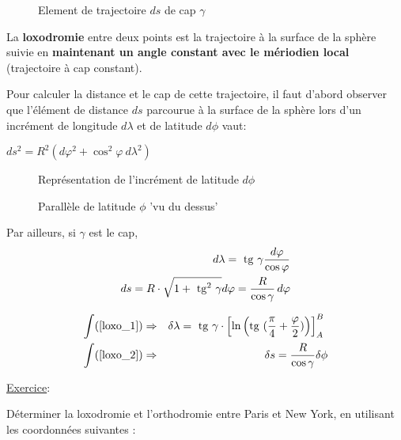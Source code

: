 \documentclass[12pt]{report}
\def\tan{\mathrm{tg}}
\begin{document}
\begin{figure}[ht]
\begin{center}
\end{center}
\caption{Element de trajectoire $ds$ de cap $\gamma$}
\label{fig:11}
\end{figure}


La \textbf{loxodromie} entre deux points est la trajectoire à la surface de la sphère suivie en \textbf{maintenant un angle constant avec le mériodien local} (trajectoire à cap constant). 

Pour calculer la distance et le cap de cette trajectoire, il faut d'abord observer que l'élément de distance $ds$ parcourue à la surface de la sphère lors d'un incrément de longitude $d\lambda$ et de latitude $d\phi$ vaut:

$ds^2=R^2(d\varphi^2+\cos^2\varphi \ d\lambda^2)$

\begin{figure}[ht]
\begin{center}
\end{center}
\caption{Représentation de l'incrément de latitude $d\phi$}
\label{fig:12}
\end{figure}

\begin{figure}[ht]
\begin{center}
\end{center}
\caption{Parallèle de latitude $\phi$ 'vu du dessus'}
\label{fig:13}
\end{figure}


Par ailleurs, si $\gamma$ est le cap,
\begin{eqnarray}
d\lambda = \ \tan \  \gamma {d\varphi\over \cos \varphi} \label{loxo_1} \\
ds = R \cdot \sqrt {1+\ \tan^2 \  \gamma} d\varphi  = \frac{R}{\cos\gamma}\,d\varphi \label{loxo_2}
\end{eqnarray}

\begin{eqnarray}
\int (\ref{loxo_1}) &\Rightarrow& \delta \lambda = \ \tan \ \gamma \cdot \left[\ln\left (\tan \ ({\pi\over 4} + \frac{\varphi}{2})\right)\right]^B_A \ \\
\int (\ref{loxo_2}) &\Rightarrow& \delta s = \frac{R}{\cos\gamma}\delta\phi
\end{eqnarray}


\underline{Exercice}: 

Déterminer la loxodromie et l'orthodromie entre Paris et New York, en utilisant les coordonnées suivantes :
\end{document}
